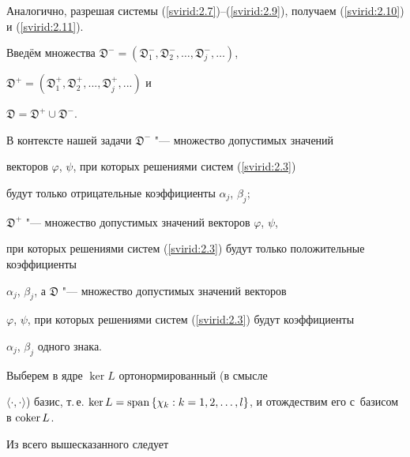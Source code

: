 Аналогично, разрешая системы (\ref{svirid:2.7})--(\ref{svirid:2.9}), получаем (\ref{svirid:2.10}) и (\ref{svirid:2.11}).



Введём множества $\mathfrak{D}^{-}=\left(\mathfrak{D}_1^{-}, \mathfrak{D}_2^{-}, \dots, \mathfrak{D}_j^{-}, \dots\right)$,

$\mathfrak{D}^{+}=\left(\mathfrak{D}_1^{+}, \mathfrak{D}_2^{+}, ..., \mathfrak{D}_j^{+}, ...\right)$ и

$\mathfrak{D}=\mathfrak{D}^{+}\cup\mathfrak{D}^{-}$.

В контексте нашей задачи $\mathfrak{D}^{-}$ "--- множество допустимых значений

векторов $\varphi$, $\psi$, при которых решениями систем (\ref{svirid:2.3})

будут только отрицательные коэффициенты $\alpha_j$, $\beta_j$;

 $\mathfrak{D}^{+}$ "--- множество допустимых значений векторов $\varphi$, $\psi$,

при которых решениями систем (\ref{svirid:2.3}) будут только положительные коэффициенты

$\alpha_j$, $\beta_j$, а $\mathfrak{D}$ "--- множество допустимых значений векторов

$\varphi$, $\psi$, при которых решениями систем (\ref{svirid:2.3}) будут коэффициенты

$\alpha_j$, $\beta_j$ одного знака.



Выберем в ядре $\ker L$ ортонормированный (в смысле

$\langle\cdot,\cdot\rangle$) базис, т.\,е. $\ker L={\rm span \, } \{\chi_k:

k=1, 2, \dots, l\}$, и отождествим его с~базисом в ${\rm coker \, } L$.



Из всего вышесказанного следует

